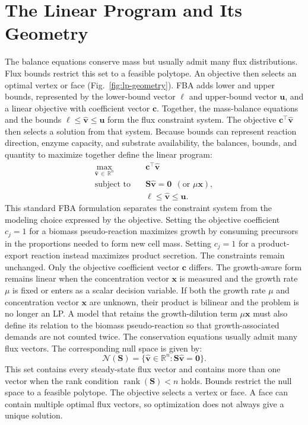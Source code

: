 \section{The Linear Program and Its Geometry}\label{sec:lp}

The balance equations conserve mass but usually admit many flux distributions.
Flux bounds restrict this set to a feasible polytope. An objective then selects
an optimal vertex or face (Fig.~\ref{fig:lp-geometry}). FBA adds lower and upper bounds,
represented by the lower-bound vector $\boldsymbol\ell$ and upper-bound
vector $\mathbf u$, and a linear objective with coefficient vector $\mathbf c$.
Together, the mass-balance equations and the bounds
$\boldsymbol\ell\le\hat{\mathbf v}\le\mathbf u$ form the flux constraint
system. The objective $\mathbf c^\top\hat{\mathbf v}$ then selects a solution
from that system. Because bounds can represent reaction direction, enzyme
capacity, and substrate availability, the balances, bounds, and quantity to
maximize together define the linear program:
\begin{equation}\label{eq:fba-lp}
\begin{aligned}
  \max_{\hat{\mathbf v}\,\in\,\mathbb R^n}\quad & \mathbf c^\top\hat{\mathbf v}\\
  \text{subject to}\quad & \mathbf S\hat{\mathbf v} = \mathbf 0\ \ (\text{or }\mu\mathbf x),\\
  & \boldsymbol\ell \le \hat{\mathbf v} \le \mathbf u.
\end{aligned}
\end{equation}
This standard FBA formulation \cite{Orth2010} separates the constraint system
from the modeling choice expressed by the objective. Setting the objective
coefficient $c_j=1$ for a biomass pseudo-reaction maximizes growth by consuming
precursors in the proportions needed to form new cell mass. Setting
$c_j=1$ for a product-export reaction instead maximizes product secretion. The
constraints remain unchanged. Only the objective coefficient vector
$\mathbf c$ differs. The growth-aware form remains linear when the
concentration vector $\mathbf x$ is measured and the growth rate $\mu$ is
fixed or enters as a scalar decision variable. If both the growth rate $\mu$
and concentration vector $\mathbf x$ are unknown, their product is bilinear
and the problem is no longer an LP. A model that retains the growth-dilution
term $\mu\mathbf x$ must also define its relation
to the biomass pseudo-reaction so that growth-associated demands are not
counted twice. The conservation equations usually admit many flux vectors.
The corresponding null space is given by:
\[
  \mathcal N(\mathbf S)=
  \{\hat{\mathbf v}\in\mathbb R^n:\mathbf S\hat{\mathbf v}=\mathbf0\}.
\]
This set contains every steady-state flux vector and contains more than one
vector when the rank condition $\operatorname{rank}(\mathbf S)<n$ holds.
Bounds restrict the null space to a feasible polytope. The objective selects a
vertex or face. A face can contain multiple optimal flux vectors, so
optimization does not always give a unique solution.


